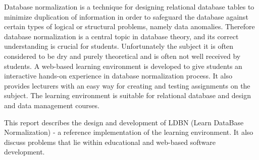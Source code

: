 Database normalization is a technique for designing relational database tables 
to minimize duplication of information in order to safeguard the database 
against certain types of logical or structural problems, namely data anomalies. 
Therefore database normalization is a central topic in database theory, and its 
correct understanding is crucial for students. Unfortunately  the subject it is 
often considered to be dry and purely theoretical and is often not well received  by students. 
A web-based learning environment is developed to give 
students an interactive hands-on experience in database normalization process. It
also provides lecturers with an easy way for creating and testing assignments 
on the subject.  
The learning environment is suitable for relational database and design and data 
management courses. 

This report describes the design and development of LDBN 
(Learn DataBase Normalization) - a reference implementation of the learning environment.
It also discuss problems that lie within educational and web-based software development.
